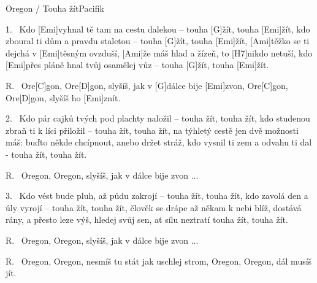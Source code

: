 \begin{song}{Oregon / Touha žít}{Pacifik}

\begin{xverse}{1.~}
Kdo [Emi]vyhnal tě tam na cestu dalekou --
touha [G]{}žít, touha [Emi]{}žít,
kdo zboural ti dům a pravdu staletou --
touha [G]{}žít, touha [Emi]{}žít,
[Ami]těžko se ti dejchá v [Emi]těsným ovzduší,
[Ami]{}že máš hlad a žízeň, to [H7]nikdo netuší,
kdo [Emi]přes pláně hnal tvůj osamělej vůz --
touha [G]{}žít, touha [Emi]{}žít.
\end{xverse}

\begin{xverse}{R.~}
Ore[C]gon, Ore[D]gon, slyšíš, jak v [G]dálce bije [Emi]zvon,
Ore[C]gon, Ore[D]gon, slyšíš ho [Emi]znít.
\end{xverse}

\begin{xverse}{2.~}
Kdo pár cajků tvých pod plachty naložil --
 touha žít, touha žít,
kdo studenou zbraň ti k líci přiložil --
 touha žít, touha žít,
na týhletý cestě jen dvě možnosti máš:
buďto někde chcípnout, anebo držet stráž,
kdo vysnil ti zem a odvahu ti dal - touha žít, touha žít.
\end{xverse}

\begin{xverse}{R.~}
Oregon, Oregon, slyšíš, jak v dálce bije zvon ...
\end{xverse}

\begin{xverse}{3.~}
Kdo vést bude pluh, až půdu zakrojí --
 touha žít, touha žít,
kdo zavolá den a úly vyrojí --
 touha žít, touha žít,
člověk se drápe až někam k nebi blíž,
dostává rány, a přesto leze výš,
hledej svůj sen, ať sílu neztratí touha žít, touha žít.
\end{xverse}

\begin{xverse}{R.~}
Oregon, Oregon, slyšíš, jak v dálce bije zvon ...
\end{xverse}

\begin{xverse}{R.~}
Oregon, Oregon, nesmíš tu stát jak uschlej strom,
Oregon, Oregon, dál musíš jít.
\end{xverse}

\end{song}

